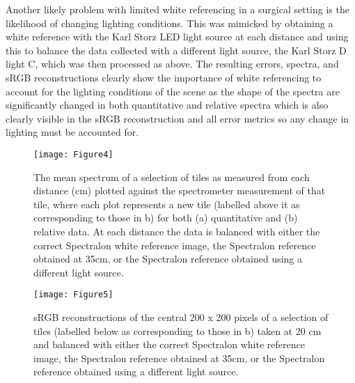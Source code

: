 Another likely problem with limited white referencing in a surgical setting is the likelihood of changing lighting conditions. This was mimicked by obtaining a white reference with the Karl Storz LED light source at each distance and using this to balance the data collected with a different light source, the Karl Storz D light C, which was then processed as above. The resulting errors, spectra, and sRGB reconstructions clearly show the importance of white referencing to account for the lighting conditions of the scene as the shape of the spectra are significantly changed in both quantitative and relative spectra which is also clearly visible in the sRGB reconstruction and all error metrics so any change in lighting must be accounted for. 
\begin{figure}[hp!]
	\centering
        \texttt{[image: Figure4]}
 \caption{The mean spectrum of a selection of tiles as measured from each distance (cm) plotted against the spectrometer measurement of that tile, where each plot represents a new tile (labelled above it as corresponding to those in b) for both (a) quantitative and (b) relative data. At each distance the data is balanced with either the correct Spectralon white reference image, the Spectralon reference obtained at 35cm, or the Spectralon reference obtained using a different light source.}
 \label{fig:summaryspectranecessity}
\end{figure}
\begin{figure}[t!]
    \centering
    \texttt{[image: Figure5]}
    \caption{sRGB reconstructions of the central 200 x 200 pixels of a selection of tiles (labelled below as corresponding to those in b) taken at 20 cm and balanced with either the correct Spectralon white reference image, the Spectralon reference obtained at 35cm, or the Spectralon reference obtained using a different light source.}
    \label{fig:summarysRGBnecessity}
\end{figure}
